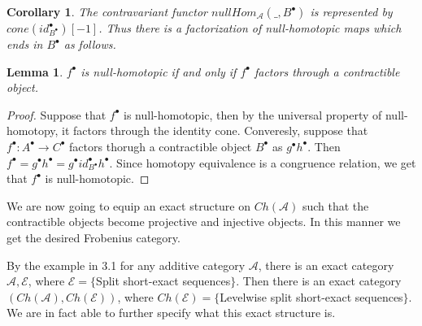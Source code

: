 \documentclass[11pt]{article}
\newtheorem{corollary}{Corollary}[theorem]
\newtheorem{lemma}[theorem]{Lemma}
\theoremstyle{definition}
\theoremstyle{remark}
\newcommand{\chain}[1]{#1^{\bullet}}
\begin{document}
            \begin{corollary}
                The contravariant functor $nullHom_{\mathcal{A}}(\_,\chain{B})$ is represented by $cone(\chain{id_{\chain{B}}})[-1]$. Thus there is a factorization of null-homotopic maps which ends in $\chain{B}$ as follows.

                \begin{center}
                \end{center}
            \end{corollary}

            \begin{lemma}
                $\chain{f}$ is null-homotopic if and only if $\chain{f}$ factors through a contractible object.
            \end{lemma}

            \begin{proof}
                Suppose that $\chain{f}$ is null-homotopic, then by the universal property of null-homotopy, it factors through the identity cone.
                Converesly, suppose that $\chain{f}:\chain{A}\rightarrow\chain{C}$ factors thorugh a contractible object $\chain{B}$ as $\chain{g}\chain{h}$. Then $\chain{f}=\chain{g}\chain{h}=\chain{g}\chain{id_{\chain{B}}}\chain{h}$. Since homotopy equivalence is a congruence relation, we get that $\chain{f}$ is null-homotopic.
            \end{proof}

            We are now going to equip an exact structure on $Ch(\mathcal{A})$ such that the contractible objects become projective and injective objects. In this manner we get the desired Frobenius category.

            By the example in 3.1 for any additive category $\mathcal{A}$, there is an exact category $\mathcal{A},\mathcal{E}$, where $\mathcal{E}=\{$Split short-exact sequences$\}$. Then there is an exact category $(Ch(\mathcal{A}),Ch(\mathcal{E}))$, where $Ch(\mathcal{E})=\{$Levelwise split short-exact sequences$\}$. We are in fact able to further specify what this exact structure is.
\end{document}
